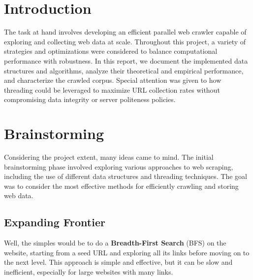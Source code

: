 \section{Introduction}



The task at hand involves developing an efficient parallel web crawler capable of exploring and collecting web data at scale. Throughout this project, a variety of strategies and optimizations were considered to balance computational performance with robustness. In this report, we document the implemented data structures and algorithms, analyze their theoretical and empirical performance, and characterize the crawled corpus. Special attention was given to how threading could be leveraged to maximize URL collection rates without compromising data integrity or server politeness policies.

\section{Brainstorming}

Considering the project extent, many ideas came to mind. The initial brainstorming phase involved exploring various approaches to web scraping, including the use of different data structures and threading techniques. The goal was to consider the most effective methods for efficiently crawling and storing web data.

\subsection{Expanding Frontier}

Well, the simples would be to do a \textbf{Breadth-First Search} (BFS) on the website, starting from a seed URL and exploring all its links before moving on to the next level. This approach is simple and effective, but it can be slow and inefficient, especially for large websites with many links.

